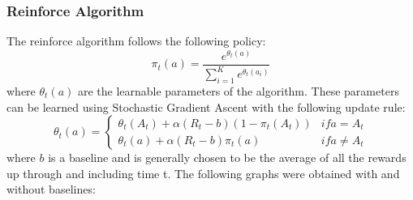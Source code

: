 \documentclass{article}
\begin{document}
		\subsubsection{Reinforce Algorithm}
		The reinforce algorithm follows the following policy:
		\begin{equation}
		\nonumber
			\pi_{t}(a) = \frac{e^{\theta_{t}(a)}}{\sum_{i=1}^{K} e^{\theta_{t}(a_{i})}}
		\end{equation}
		where $\theta_{t}(a)$ are the learnable parameters of the algorithm. These parameters can be learned using Stochastic Gradient Ascent with the following
		update rule:
		\begin{equation}
		\nonumber
			\theta_{t}(a) = \begin{cases}
				\theta_{t}(A_{t}) + \alpha (R_{t} - b) (1 - \pi_{t}(A_{t})) & if a = A_{t} \\
				\theta_{t}(a) + \alpha (R_{t} - b) \pi_{t}(a) & if a \ne A_{t}
			\end{cases}
		\end{equation}
		where $b$ is a baseline and is generally chosen to be the average of all the rewards up through and including time t. The following graphs were obtained
		with and without baselines:
		
\end{document}
